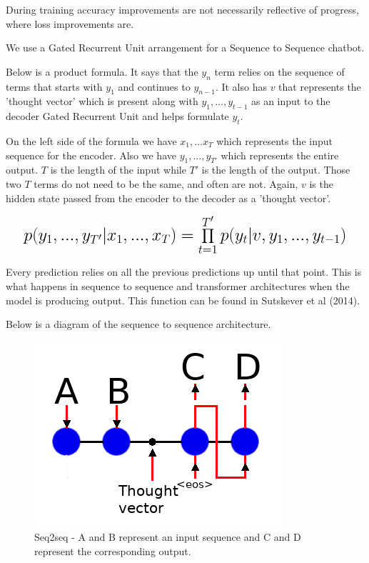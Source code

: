 During training accuracy improvements are not necessarily reflective of progress, where loss improvements are.

We use a Gated Recurrent Unit arrangement for a Sequence to Sequence chatbot.

Below is a product formula. It says that the $y_n$ term relies on the sequence of terms that starts with $y_1$ and continues to $y_{n-1}$. It also has $v$ that represents the 'thought vector' which is present along with $y_1,...,y_{t-1}$ as an input to the decoder Gated Recurrent Unit and helps formulate $y_t$.

On the left side of the formula we have $x_1,...x_T$ which represents the input sequence for the encoder. Also we have $y_1,...,y_{T'}$ which represents the entire output. $T$ is the length of the input while $T'$ is the length of the output. Those two $T$ terms do not need to be the same, and often are not. Again, $v$ is the hidden state passed from the encoder to the decoder as a 'thought vector'.

\[
\mathlarger{ \mathlarger{ \mathlarger{
		p(y_1,...,y_{T'}|x_1,...,x_T) = \prod_{t=1}^{T'} p(y_t|v,y_1,..., y_{t-1}) 
} } }
\]

Every prediction relies on all the previous predictions up until that point. This is what happens in sequence to sequence and transformer architectures when the model is producing output. This function can be found in Sutskever et al (2014)\cite{DBLP:journals/corr/SutskeverVL14}.

Below is a diagram of the sequence to sequence architecture.

\begin{figure}[H]

\begin{center}

\includegraphics[scale=0.5]{diagram-nmt}

	
\end{center}

\caption[Sequence to Sequence]{Seq2seq - A and B represent an input sequence and C and D represent the corresponding output.}

\end{figure}



